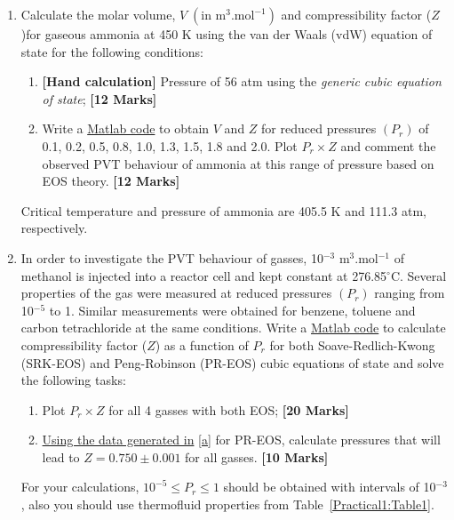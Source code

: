 \documentclass[12pts,a4paper,amsmath,amssymb,floatfix]{article}%
\renewcommand\leq{\leqslant}
\begin{document}
\begin{enumerate}[label=\bfseries Problem \arabic*:]
%
     \item\label{Prob1} Calculate the molar volume, $V\;\left(\text{in m}^{3}\text{.mol}^{-1}\right)$ and compressibility factor ($Z$)for gaseous ammonia at 450 K using the van der Waals (vdW) equation of state for the following conditions:
          \begin{enumerate}[label=\bfseries Task \arabic*]
              \item\label{c} {\bf[Hand calculation]} Pressure of 56 atm using the {\it generic cubic equation of state}; \hfill{\bf[12 Marks]}
              \item\label{d} Write a \underline{Matlab code} to obtain $V$ and $Z$ for reduced pressures $\left(P_{r}\right)$ of 0.1, 0.2, 0.5, 0.8, 1.0, 1.3, 1.5, 1.8 and 2.0. Plot $P_{r}\times Z$ and comment the observed PVT behaviour of ammonia at this range of pressure based on EOS theory. \hfill{\bf[12 Marks]}
          \end{enumerate}
          Critical temperature and pressure of ammonia are 405.5 K and 111.3 atm, respectively.

     \item\label{Prob2} In order to investigate the PVT behaviour of gasses, 10$^{-3}$ m$^{3}$.mol$^{-1}$ of methanol is injected into a reactor cell and kept constant at 276.85$^{\circ}$C. Several properties of the gas were measured at reduced pressures $\left(P_{r}\right)$ ranging from 10$^{-5}$ to 1.  Similar measurements were obtained for benzene, toluene and carbon tetrachloride at the same conditions. Write a \underline{Matlab code} to calculate compressibility factor ($Z$) as a function of $P_{r}$ for both Soave-Redlich-Kwong (SRK-EOS) and Peng-Robinson (PR-EOS) cubic equations of state and solve the following tasks:
          \begin{enumerate}[label=\bfseries Task \arabic*]
              \item\label{a} Plot $P_{r}\times Z$ for all 4 gasses with both EOS; \hfill{\bf[20 Marks]} 
              \item\label{b} \underline{Using the data generated in} \ref{a} for PR-EOS, calculate pressures that will lead to $Z=0.750\pm0.001$ for all gasses. \hfill{\bf[10 Marks]} 
          \end{enumerate}
For your calculations, $10^{-5}\leq P_{r}\leq 1$ should be obtained with intervals of 10$^{-3}$, also you should use thermofluid properties from Table~\ref{Practical1:Table1}. 


\end{enumerate}
\end{document}
